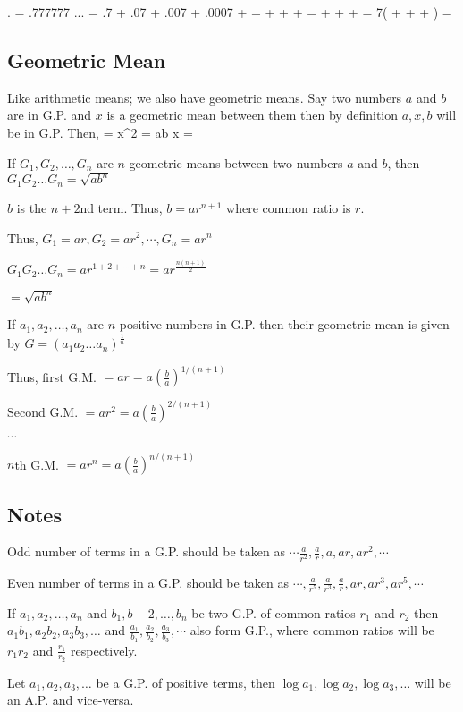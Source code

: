 \startformula . = .777777 ... \infty\stopformula
\startformula = .7 + .07 + .007 + .0007 + \cdots\stopformula
\startformula =  +  +  + \cdots\stopformula
\startformula =  +  +  + \cdots\stopformula
\startformula = 7\left( +  +  + \cdots\right)\stopformula
\startformula = \stopformula

\subsection{Geometric Mean}
Like arithmetic means; we also have geometric means. Say two numbers $a$ and $b$ are in G.P. and $x$ is a geometric mean between
them then by definition $a, x, b$ will be in G.P. Then,
\startformula {} = \stopformula
\startformula \Rightarrow x^2 = ab \Rightarrow x = \stopformula

If $G_1, G_2, \ldots, G_n$ are $n$ geometric means between two numbers $a$ and $b$, then $G_1G_2\ldots G_n = \sqrt{ab^n}$

 $b$ is the $n + 2$nd term. Thus, $b = ar^{n + 1}$ where common ratio is $r$.

Thus, $G_1 = ar, G_2 = ar^2, \cdots, G_n = ar^n$

$G_1G_2\ldots G_n = ar^{1 + 2 + \cdots + n} = ar^{\frac{n(n + 1)}{2}}$

$= \sqrt{ab^n}$

If $a_1, a_2, \ldots, a_n$ are $n$ positive numbers in G.P. then their geometric mean is given by $G = (a_1a_2\ldots
a_n)^{\frac{1}{n}}$

Thus, first G.M. $= ar = a\left(\frac{b}{a}\right)^{1/(n + 1)}$

Second G.M. $= ar^2 = a\left(\frac{b}{a}\right)^{2/(n + 1)}$

$\cdots$

$n$th G.M. $= ar^{n} = a\left(\frac{b}{a}\right)^{n/(n + 1)}$
\subsection{Notes}
\startitemize[n]
\item Odd number of terms in a G.P. should be taken as $\cdots\frac{a}{r^2}, \frac{a}{r}, a, ar, ar^2, \cdots$
\item Even number of terms in a G.P. should be taken as $\cdots, \frac{a}{r^5}, \frac{a}{r^3}, \frac{a}{r}, ar, ar^3, ar^5, \cdots$
\item If $a_1, a_2, \ldots, a_n$ and $b_1, b-2, \ldots, b_n$ be two G.P. of common ratios $r_1$ and $r_2$ then $a_1b_1, a_2b_2,
  a_3b_3, \ldots$ and $\frac{a_1}{b_1}, \frac{a_2}{b_2}, \frac{a_3}{b_3}, \cdots$ also form G.P., where common ratios will be
  $r_1r_2$ and $\frac{r_1}{r_2}$ respectively.
\item Let $a_1, a_2, a_3, \ldots$ be a G.P. of positive terms, then $\log a_1, \log a_2, \log a_3, \ldots$ will be an A.P. and
  vice-versa.

